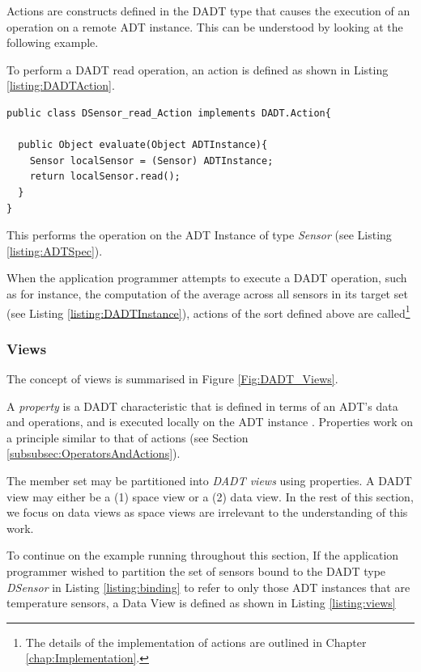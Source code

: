 Actions are constructs defined in the DADT type that causes the execution of an
operation on a remote ADT instance. This can be understood by looking at the
following example.

To perform a DADT read operation, an action is defined
as shown in Listing
\ref{listing:DADTAction}. 
 
\begin{lstlisting}[frame=trbl, basewidth={0.55em, 0.6em}, captionpos=b, 
basicstyle=\ttfamily\footnotesize, breaklines, caption = Defining a DADT action, label = listing:DADTAction ]  
public class DSensor_read_Action implements DADT.Action{

  public Object evaluate(Object ADTInstance){
	Sensor localSensor = (Sensor) ADTInstance;
    return localSensor.read();
  }
}
\end{lstlisting}

This performs the operation on the ADT Instance of type \emph{Sensor} (see
Listing \ref{listing:ADTSpec}).

When the application programmer attempts to execute a DADT operation, such as
for instance, the computation of the average
across all sensors in its target set (see Listing \ref{listing:DADTInstance}),
actions of the sort defined above are called\footnote{The details of the
implementation of actions are outlined in Chapter \ref{chap:Implementation}.} 

\subsubsection{Views} \label{subsubsec:views}

The concept of views is summarised in Figure \ref{Fig:DADT_Views}.

A \emph{property} is a DADT characteristic that is defined in terms of an ADT's
data and operations, and is executed locally on the ADT instance
\cite{migliavacca_DADT:2006}. Properties work on a principle similar to that of
actions (see Section \ref{subsubsec:OperatorsAndActions}).

The member set may be partitioned into \emph{DADT views} using properties. A
DADT view may either be a (1) space view or a (2) data view. In the rest of this
section, we focus on data views as space views are irrelevant to the
understanding of this work. 

To continue on the example running throughout this section, If the application
programmer wished to partition the set of sensors bound to the DADT type
\emph{DSensor} in Listing \ref{listing:binding} to refer to only those ADT
instances that are temperature sensors, a Data View is defined as shown in Listing
\ref{listing:views} 
  
